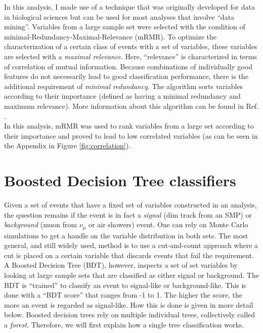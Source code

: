In this analysis, I made use of a technique that was originally developed for data in biological sciences but can be used for most analyses that involve ``data mining''. Variables from a large sample set were selected with the condition of minimal-Redundancy-Maximal-Relevance (mRMR). To optimize the characterization of a certain class of events with a set of variables, these variables are selected with a \textit{maximal relevance}. Here, ``relevance'' is characterized in terms of correlation of mutual information. Because combinations of individually good features do not necessarily lead to good classification performance, there is the additional requirement of \textit{minimal redundancy}. The algorithm sorts variables according to their importance (defined as having a minimal redundancy and maximum relevance). More information about this algorithm can be found in Ref. \cite{1453511}.\\

\noindent In this analysis, mRMR was used to rank variables from a large set according to their importance and proved to lead to low correlated variables (as can be seen in the Appendix in Figure \ref{fig:correlation}).




\section{Boosted Decision Tree classifiers}
\label{sec:BDT}
Given a set of events that have a fixed set of variables constructed in an analysis, the question remains if the event is in fact a \textit{signal} (dim track from an SMP) or \textit{background} (muon from $\nu_\mu$ or air showers) event. One can rely on Monte Carlo simulations to get a handle on the variable distribution in both sets. The most general, and still widely used, method is to use a cut-and-count approach where a cut is placed on a certain variable that discards events that fail the requirement. A Boosted Decision Tree (BDT), however, inspects a set of set variables by looking at large sample sets that are classified as either signal or background. The BDT is ``trained'' to classify an event to signal-like or background-like. This is done with a ``BDT score'' that ranges from -1 to 1. The higher the score, the more an event is regarded as signal-like. How this is done is given in more detail below. Boosted decision trees rely on multiple individual trees, collectively called a \textit{forest}. Therefore, we will first explain how a single tree classification works.


